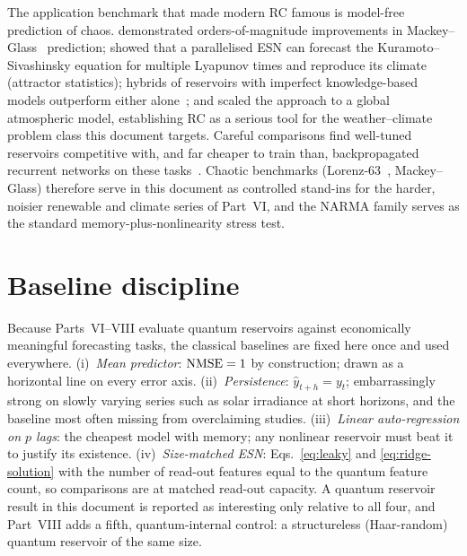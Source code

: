 The application benchmark that made modern RC famous is model-free prediction
of chaos. \citet{jaeger2004harnessing} demonstrated orders-of-magnitude
improvements in Mackey--Glass~\citep{mackey1977oscillation} prediction;
\citet{pathak2018model} showed that a parallelised ESN can forecast the
Kuramoto--Sivashinsky equation for multiple Lyapunov times and reproduce its
climate (attractor statistics); hybrids of reservoirs with imperfect
knowledge-based models outperform either alone~\citep{pathak2018hybrid};
and \citet{arcomano2020machine} scaled the approach to a global atmospheric
model, establishing RC as a serious tool for the weather--climate problem class
this document targets. Careful comparisons find well-tuned reservoirs
competitive with, and far cheaper to train than, backpropagated recurrent
networks on these tasks~\citep{vlachas2020backpropagation}. Chaotic benchmarks
(Lorenz-63~\citep{lorenz1963deterministic}, Mackey--Glass) therefore serve in
this document as controlled stand-ins for the harder, noisier renewable and
climate series of Part~VI, and the NARMA family serves as the standard
memory-plus-nonlinearity stress test.

\section{Baseline discipline}
\label{sec:baselines}

Because Parts~VI--VIII evaluate quantum reservoirs against economically
meaningful forecasting tasks, the classical baselines are fixed here once and
used everywhere. (i)~\emph{Mean predictor}: $\mathrm{NMSE} = 1$ by construction; drawn
as a horizontal line on every error axis. (ii)~\emph{Persistence}:
$\hat y_{t+h} = y_t$; embarrassingly strong on slowly varying series such as
solar irradiance at short horizons, and the baseline most often missing from
overclaiming studies. (iii)~\emph{Linear auto-regression on $p$ lags}: the
cheapest model with memory; any nonlinear reservoir must beat it to justify
its existence. (iv)~\emph{Size-matched ESN}: Eqs.~\eqref{eq:leaky} and
\eqref{eq:ridge-solution} with the number of read-out features equal to the
quantum feature count, so comparisons are at matched read-out capacity.
A quantum reservoir result in this document is reported as interesting only
relative to all four, and Part~VIII adds a fifth, quantum-internal control:
a structureless (Haar-random) quantum reservoir of the same size.
